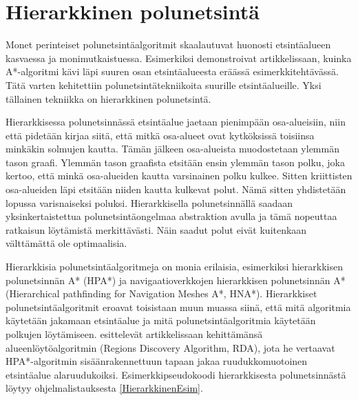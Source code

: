 \section{Hierarkkinen polunetsintä}\label{hpa}
Monet perinteiset polunetsintäalgoritmit skaalautuvat huonosti etsintäalueen 
kasvaessa ja monimutkaistuessa. Esimerkiksi \textcite{rda} demonstroivat 
artikkelissaan, kuinka A*-algoritmi kävi läpi suuren osan etsintäalueesta 
eräässä esimerkkitehtävässä. Tätä varten kehitettiin polunetsintätekniikoita 
suurille etsintäalueille. Yksi tällainen tekniikka on hierarkkinen 
polunetsintä.\cite{rda} \par
	Hierarkkisessa polunetsinnässä etsintäalue jaetaan pienimpään 
osa-alueisiin, niin että pidetään kirjaa siitä, että mitkä osa-alueet ovat 
kytköksissä toisiinsa minkäkin solmujen kautta. Tämän jälkeen 
osa-alueista muodostetaan ylemmän tason graafi.\cite{rda} Ylemmän tason 
graafista etsitään ensin ylemmän tason polku, joka kertoo, että minkä 
osa-alueiden kautta varsinainen polku kulkee. Sitten kriittisten osa-alueiden 
läpi etsitään niiden kautta kulkevat polut. Nämä sitten yhdistetään lopussa 
varisnaiseksi poluksi. Hierarkkisella polunetsinnällä saadaan 
yksinkertaistettua polunetsintäongelmaa abstraktion avulla ja tämä nopeuttaa 
ratkaisun löytämistä merkittävästi. Näin saadut polut eivät kuitenkaan 
välttämättä ole optimaalisia.\cite{rda} \par
	Hierarkkisia polunetsintäalgoritmeja on monia erilaisia, esimerkiksi 
hierarkkisen polunetsinnän A* (HPA*) ja navigaatioverkkojen hierarkkisen 
polunetsinnän A* (Hierarchical pathfinding for Navigation Meshes A*, 
HNA*).\cite{rda} Hierarkkiset polunetsintäalgoritmit eroavat toisistaan muun 
muassa siinä, että mitä algoritmia käytetään jakamaan etsintäalue ja mitä 
polunetsintäalgoritmia käytetään polkujen löytämiseen. \textcite{rda} 
esittelevät artikkelissaan kehittämänsä alueenlöytöalgoritmin (Regions 
Discovery Algorithm, RDA), jota he vertaavat HPA*-algoritmin 
sisäänrakennettuun tapaan jakaa ruudukkomuotoinen etsintäalue alaruudukoiksi. 
Esimerkkipseudokoodi hierarkkisesta polunetsinnästä löytyy ohjelmalistauksesta 
\ref{HierarkkinenEsim}.
